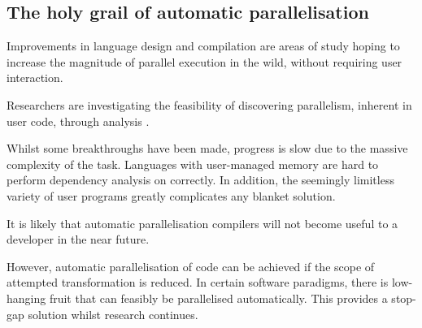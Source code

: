 \subsection{The holy grail of automatic parallelisation}
Improvements in language design and compilation are areas of study hoping to increase the magnitude of parallel execution in the wild, without requiring user interaction.

Researchers are investigating the feasibility of discovering parallelism, inherent in user code, through analysis \cite{auto_par}.

Whilst some breakthroughs have been made, progress is slow due to the massive complexity of the task.
Languages with user-managed memory are hard to perform dependency analysis on correctly. In addition, the seemingly limitless variety of user programs greatly complicates any blanket solution.

It is likely that automatic parallelisation compilers will not become useful to a developer  in the near future.

However, automatic parallelisation of code can be achieved if the scope of attempted transformation is reduced. In certain software paradigms, there is low-hanging fruit that can feasibly be parallelised automatically. This provides a stop-gap solution whilst research continues.

